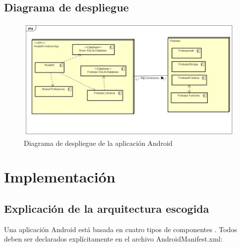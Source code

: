\documentclass[twoside]{report}
\begin{document}
\subsection{Diagrama de despliegue}

\begin{figure}[H]
\centering
\includegraphics[scale=0.5]{images/deploymentModel}
\caption{Diagrama de despliegue de la aplicación Android}
\end{figure}


\section{Implementación}

\subsection{Explicación de la arquitectura escogida}

Una aplicación Android está basada en cuatro tipos de componentes \cite{androidfund} \cite{androidpacktpub}. Todos deben ser declarados explícitamente en el archivo AndroidManifest.xml:
\end{document}
